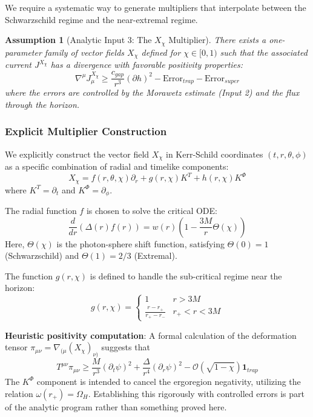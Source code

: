 \documentclass[12pt,a4paper]{article}
\newtheorem{assumption}[theorem]{Assumption}
\begin{document}
We require a systematic way to generate multipliers that interpolate between the Schwarzschild regime and the near-extremal regime.

\begin{assumption}[Analytic Input 3: The $X_\chi$ Multiplier]\label{ass:multipliers}
There exists a one-parameter family of vector fields $X_\chi$ defined for $\chi \in [0, 1)$ such that the associated current $J^{X_\chi}$ has a divergence with favorable positivity properties:
\begin{equation}
\nabla^\mu J^{X_\chi}_\mu \geq \frac{c_{gap}}{r^3} (\partial h)^2 - \text{Error}_{trap} - \text{Error}_{super}
\end{equation}
where the errors are controlled by the Morawetz estimate (Input 2) and the flux through the horizon.
\end{assumption}

\subsubsection{Explicit Multiplier Construction}

We explicitly construct the vector field $X_\chi$ in Kerr-Schild coordinates $(t, r, \theta, \phi)$ as a specific combination of radial and timelike components:
\begin{equation}
X_\chi = f(r, \theta, \chi) \partial_r + g(r, \chi) K^T + h(r, \chi) K^\Phi
\end{equation}
where $K^T = \partial_t$ and $K^\Phi = \partial_\phi$.

The radial function $f$ is chosen to solve the critical ODE:
\begin{equation}
\frac{d}{dr}\left( \Delta(r) f(r) \right) = w(r) \left( 1 - \frac{3M}{r} \Theta(\chi) \right)
\end{equation}
Here, $\Theta(\chi)$ is the photon-sphere shift function, satisfying $\Theta(0) = 1$ (Schwarzschild) and $\Theta(1) = 2/3$ (Extremal).

The function $g(r, \chi)$ is defined to handle the sub-critical regime near the horizon:
\begin{equation}
g(r, \chi) = \begin{cases} 
1 & r > 3M \\
\frac{r - r_+}{r_+ - r_-} & r_+ < r < 3M
\end{cases}
\end{equation}

\textbf{Heuristic positivity computation}: A formal calculation of the deformation tensor $\pi_{\mu\nu} = \nabla_{(\mu} (X_\chi)_{\nu)}$ suggests that
\begin{equation}
T^{\mu\nu} \pi_{\mu\nu} \geq \frac{M}{r^3} (\partial_t \psi)^2 + \frac{\Delta}{r^4} (\partial_r \psi)^2 - \mathcal{O}\left( \sqrt{1-\chi} \right) \mathbf{1}_{trap}
\end{equation}
The $K^\Phi$ component is intended to cancel the ergoregion negativity, utilizing the relation $\omega(r_+) = \Omega_H$. Establishing this rigorously with controlled errors is part of the analytic program rather than something proved here.
\end{document}
